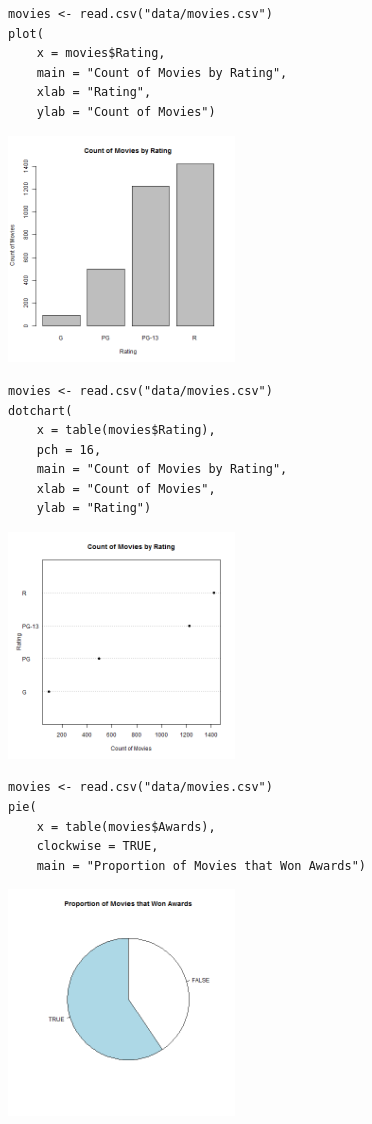 \documentclass[a4paper, captions=tableheading]{tufte-book}
\begin{document}
\begin{verbatim}
movies <- read.csv("data/movies.csv")
plot(
	x = movies$Rating,
	main = "Count of Movies by Rating",
	xlab = "Rating",
	ylab = "Count of Movies")
\end{verbatim}

\includegraphics[height=6cm]{img/1-cat-base-01.png}


\begin{verbatim}
movies <- read.csv("data/movies.csv")
dotchart(
	x = table(movies$Rating),
	pch = 16,
	main = "Count of Movies by Rating",
	xlab = "Count of Movies",
	ylab = "Rating")
\end{verbatim}

\includegraphics[height=6cm]{img/1-cat-base-02.png}


\begin{verbatim}
movies <- read.csv("data/movies.csv")
pie(
	x = table(movies$Awards),
	clockwise = TRUE,
	main = "Proportion of Movies that Won Awards")
\end{verbatim}

\includegraphics[height=6cm]{img/1-cat-base-03.png}
\end{document}
